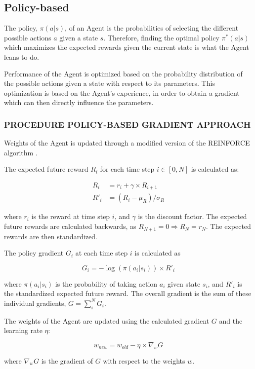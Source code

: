 \documentclass{article}
\renewenvironment{leftbar}[1][\hsize]{
    \def\FrameCommand{{\color{barcolor}\vrule width 0.5pt \hspace{10pt}}}
    \MakeFramed{\hsize#1 \advance\hsize-\width \FrameRestore}
}{\endMakeFramed}
\begin{document}
\subsection*{Policy-based}
\begin{leftbar}
    The policy, $\pi(a|s)$, of an Agent is the probabilities of selecting the different possible actions $a$ given a state $s$. Therefore, finding the optimal policy $\pi^*(a|s)$ which maximizes the expected rewards given the current state is what the Agent leans to do. \cite{HF-approaches}

    Performance of the Agent is optimized based on the probability distribution of the possible actions given a state with respect to its parameters. This optimization is based on the Agent's experience, in order to obtain a gradient which can then directly influence the parameters. \cite{HF-policy}

    \hypertarget{sec:policy-based-approach}{}
    \subsubsection*{PROCEDURE \hfill POLICY-BASED GRADIENT APPROACH}

    Weights of the Agent is updated through a modified version of the REINFORCE algorithm \cite{REINFORCE}.

    The expected future reward $R_i$ for each time step $i \in [0, N]$ is calculated as:

    \begin{equation*}
        \begin{split}
            R_i &= r_i + \gamma \times R_{i+1} \\
            R'_i &= (R_i - \mu_R) / \sigma_R
        \end{split}
    \end{equation*}

    where $r_i$ is the reward at time step $i$, and $\gamma$ is the discount factor. The expected future rewards are calculated backwards, as $R_{N+1} = 0 \Rightarrow R_N = r_N$. The expected rewards are then standardized.

    The policy gradient $G_i$ at each time step $i$ is calculated as

    \begin{equation*}
        G_i = - \log(\pi(a_i|s_i)) \times R'_i
    \end{equation*}

    where $\pi(a_i|s_i)$ is the probability of taking action $a_i$ given state $s_i$, and $R'_i$ is the standardized expected future reward. The overall gradient is the sum of these individual gradients, $G = \sum_{i}^N G_i$.

    The weights of the Agent are updated using the calculated gradient $G$ and the learning rate $\eta$:

    \begin{equation*}
        w_{new} = w_{old} - \eta \times \nabla_w G
    \end{equation*}

    where $\nabla_w G$ is the gradient of $G$ with respect to the weights $w$.

\end{leftbar}
\end{document}
